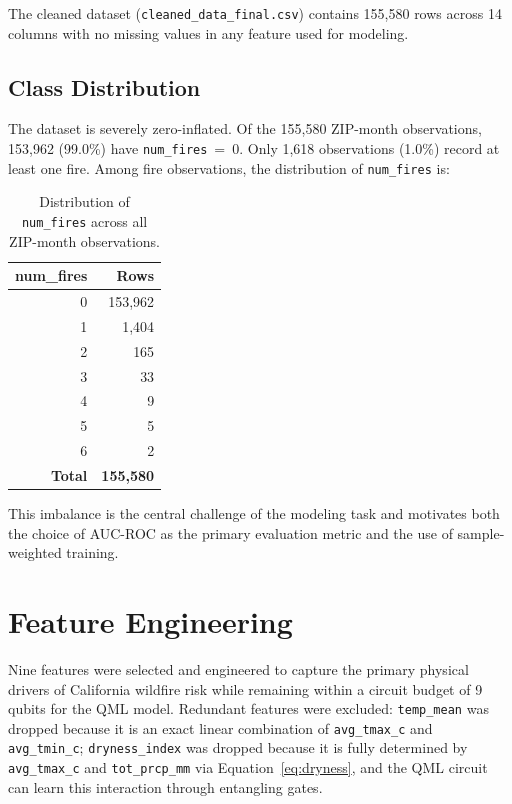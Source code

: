\documentclass[11pt,a4paper]{article}
\begin{document}
The cleaned dataset (\texttt{cleaned\_data\_final.csv}) contains 155,580 rows
across 14 columns with no missing values in any feature used for modeling.

\subsection{Class Distribution}
\label{sec:imbalance}

The dataset is severely zero-inflated. Of the 155,580 ZIP-month observations,
153,962 (99.0\%) have \texttt{num\_fires}~=~0. Only 1,618 observations (1.0\%)
record at least one fire. Among fire observations, the distribution of
\texttt{num\_fires} is:

\begin{table}[H]
\centering
\caption{Distribution of \texttt{num\_fires} across all ZIP-month observations.}
\begin{tabular}{rr}
\toprule
\textbf{num\_fires} & \textbf{Rows} \\
\midrule
0 & 153,962 \\
1 & 1,404 \\
2 & 165 \\
3 & 33 \\
4 & 9 \\
5 & 5 \\
6 & 2 \\
\midrule
\textbf{Total} & \textbf{155,580} \\
\bottomrule
\end{tabular}
\label{tab:fire_dist}
\end{table}

This imbalance is the central challenge of the modeling task and motivates both
the choice of AUC-ROC as the primary evaluation metric and the use of
sample-weighted training.

\section{Feature Engineering}
\label{sec:features}

Nine features were selected and engineered to capture the primary physical
drivers of California wildfire risk while remaining within a circuit budget
of 9 qubits for the QML model. Redundant features were excluded:
\texttt{temp\_mean} was dropped because it is an exact linear combination of
\texttt{avg\_tmax\_c} and \texttt{avg\_tmin\_c}; \texttt{dryness\_index}
was dropped because it is fully determined by \texttt{avg\_tmax\_c} and
\texttt{tot\_prcp\_mm} via Equation~\eqref{eq:dryness}, and the QML
circuit can learn this interaction through entangling gates.
\end{document}
